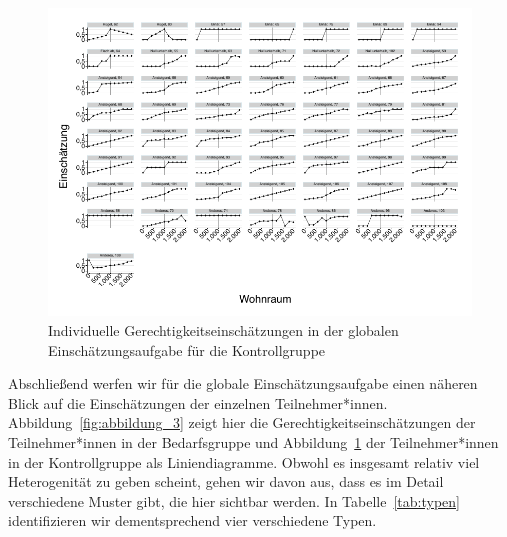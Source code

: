 \documentclass[justified,nobib,symmetric,twoside]{tufte-handout}
\begin{document}
\begin{figure}[t]\label{fig:abbildung_4}
   \center
   \includegraphics[width=0.99\linewidth]{figure_4.pdf}
   \caption{Individuelle Gerechtigkeitseinschätzungen in der globalen Einschätzungsaufgabe für die Kontrollgruppe}
\end{figure}

Abschließend werfen wir für die globale Einschätzungsaufgabe einen näheren Blick auf die Einschätzungen der einzelnen Teilnehmer*innen.
Abbildung~\ref{fig:abbildung_3} zeigt hier die Gerechtigkeitseinschätzungen der Teilnehmer*innen in der Bedarfs\-gruppe und Abbildung~\ref{fig:abbildung_4} der Teilnehmer*innen in der Kontrollgruppe als Liniendiagramme.
Obwohl es insgesamt relativ viel Heterogenität zu geben scheint, gehen wir davon aus, dass es im Detail verschiedene Muster gibt, die hier sichtbar werden.
In Tabelle~\ref{tab:typen} identifizieren wir dementsprechend vier verschiedene Typen.
\end{document}
